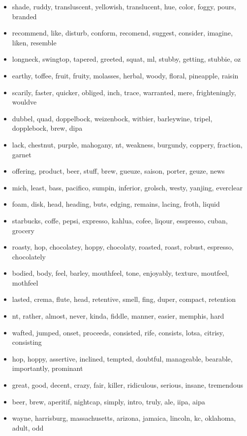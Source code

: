 \documentclass[11pt,a4paper]{article}
\begin{document}
\begin{itemize}
\footnotesize
\item shade, ruddy, transluscent, yellowish, translucent, hue, color, foggy, pours, branded 
\item recommend, like, disturb, conform, recomend, suggest, consider, imagine, liken, resemble
\item longneck, swingtop, tapered, greeted, squat, ml, stubby, getting, stubbie, oz 
\item earthy, toffee, fruit, fruity, molasses, herbal, woody, floral, pineapple, raisin 
\item scarily, faster, quicker, obliged, inch, trace, warranted, mere, frighteningly, wouldve 
\item dubbel, quad, doppelbock, weizenbock, witbier, barleywine, tripel, dopplebock, brew, dipa 
\item lack, chestnut, purple, mahogany, nt, weakness, burgundy, coppery, fraction, garnet
\item offering, product, beer, stuff, brew, gueuze, saison, porter, geuze, news 
\item mich, least, bass, pacifico, sumpin, inferior, grolsch, westy, yanjing, everclear 
\item foam, disk, head, heading, buts, edging, remains, lacing, froth, liquid 
\item starbucks, coffe, pepsi, expresso, kahlua, cofee, liqour, esspresso, cuban, grocery 
\item roasty, hop, chocolatey, hoppy, chocolaty, roasted, roast, robust, espresso, chocolately 
\item bodied, body, feel, barley, mouthfeel, tone, enjoyably, texture, moutfeel, mothfeel 
\item lasted, crema, flute, head, retentive, smell, fing, duper, compact, retention 
\item nt, rather, almost, never, kinda, fiddle, manner, easier, memphis, hard
\item wafted, jumped, onset, proceeds, consisted, rife, consists, lotsa, citrisy, consisting 
\item hop, hoppy, assertive, inclined, tempted, doubtful, manageable, bearable, importantly, prominant
\item great, good, decent, crazy, fair, killer, ridiculous, serious, insane, tremendous 
\item beer, brew, aperitif, nightcap, simply, intro, truly, ale, iipa, aipa 
\item wayne, harrisburg, massachusetts, arizona, jamaica, lincoln, kc, oklahoma, adult, odd 
\end{itemize}
\end{document}
